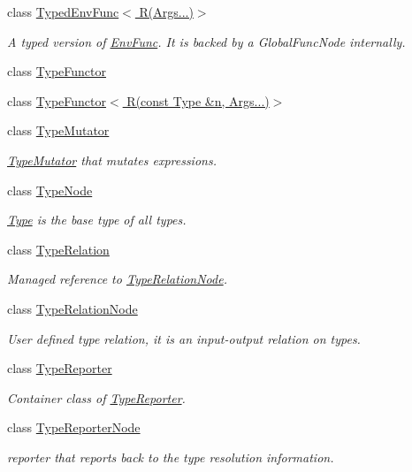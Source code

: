 \begin{DoxyCompactItemize}
class \hyperlink{classtvm_1_1TypedEnvFunc_3_01R_07Args_8_8_8_08_4}{Typed\+Env\+Func$<$ R(\+Args...)$>$}
\begin{DoxyCompactList}\small\item\em A typed version of \hyperlink{classtvm_1_1EnvFunc}{Env\+Func}. It is backed by a Global\+Func\+Node internally. \end{DoxyCompactList}\item 
class \hyperlink{classtvm_1_1TypeFunctor}{Type\+Functor}
\item 
class \hyperlink{classtvm_1_1TypeFunctor_3_01R_07const_01Type_01_6n_00_01Args_8_8_8_08_4}{Type\+Functor$<$ R(const Type \&n, Args...)$>$}
\item 
class \hyperlink{classtvm_1_1TypeMutator}{Type\+Mutator}
\begin{DoxyCompactList}\small\item\em \hyperlink{classtvm_1_1TypeMutator}{Type\+Mutator} that mutates expressions. \end{DoxyCompactList}\item 
class \hyperlink{classtvm_1_1TypeNode}{Type\+Node}
\begin{DoxyCompactList}\small\item\em \hyperlink{classtvm_1_1Type}{Type} is the base type of all types. \end{DoxyCompactList}\item 
class \hyperlink{classtvm_1_1TypeRelation}{Type\+Relation}
\begin{DoxyCompactList}\small\item\em Managed reference to \hyperlink{classtvm_1_1TypeRelationNode}{Type\+Relation\+Node}. \end{DoxyCompactList}\item 
class \hyperlink{classtvm_1_1TypeRelationNode}{Type\+Relation\+Node}
\begin{DoxyCompactList}\small\item\em User defined type relation, it is an input-\/output relation on types. \end{DoxyCompactList}\item 
class \hyperlink{classtvm_1_1TypeReporter}{Type\+Reporter}
\begin{DoxyCompactList}\small\item\em Container class of \hyperlink{classtvm_1_1TypeReporter}{Type\+Reporter}. \end{DoxyCompactList}\item 
class \hyperlink{classtvm_1_1TypeReporterNode}{Type\+Reporter\+Node}
\begin{DoxyCompactList}\small\item\em reporter that reports back to the type resolution information. \end{DoxyCompactList}\item 

\end{DoxyCompactItemize}
